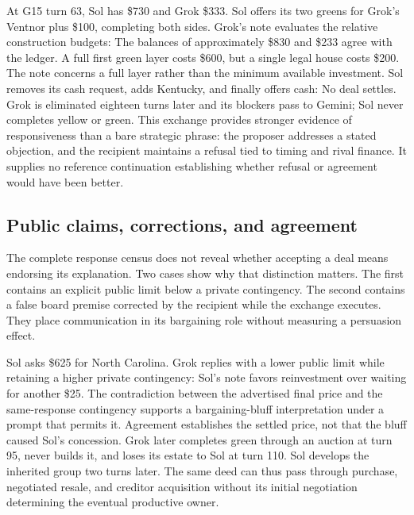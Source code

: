 At G15 turn 63, Sol has \$730 and Grok \$333. Sol offers its two greens for Grok's Ventnor plus \$100, completing both sides. Grok's note evaluates the relative construction budgets:
The balances of approximately \$830 and \$233 agree with the ledger. A full first green layer costs \$600, but a single legal house costs \$200. The note concerns a full layer rather than the minimum available investment. Sol removes its cash request, adds Kentucky, and finally offers cash:
No deal settles. Grok is eliminated eighteen turns later and its blockers pass to Gemini; Sol never completes yellow or green. This exchange provides stronger evidence of responsiveness than a bare strategic phrase: the proposer addresses a stated objection, and the recipient maintains a refusal tied to timing and rival finance. It supplies no reference continuation establishing whether refusal or agreement would have been better.

\subsection{Public claims, corrections, and agreement}

The complete response census does not reveal whether accepting a deal means endorsing its explanation. Two cases show why that distinction matters. The first contains an explicit public limit below a private contingency. The second contains a false board premise corrected by the recipient while the exchange executes. They place communication in its bargaining role without measuring a persuasion effect.


Sol asks \$625 for North Carolina. Grok replies with a lower public limit while retaining a higher private contingency:
Sol's note favors reinvestment over waiting for another \$25. The contradiction between the advertised final price and the same-response contingency supports a bargaining-bluff interpretation under a prompt that permits it. Agreement establishes the settled price, not that the bluff caused Sol's concession. Grok later completes green through an auction at turn 95, never builds it, and loses its estate to Sol at turn 110. Sol develops the inherited group two turns later. The same deed can thus pass through purchase, negotiated resale, and creditor acquisition without its initial negotiation determining the eventual productive owner.


